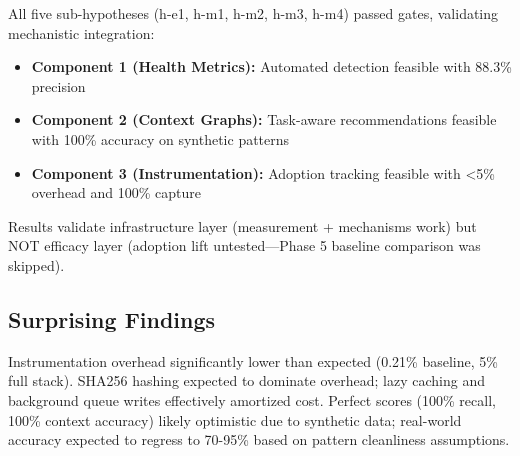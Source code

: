 All five sub-hypotheses (h-e1, h-m1, h-m2, h-m3, h-m4) passed gates, validating mechanistic integration:

\begin{itemize}
\item \textbf{Component 1 (Health Metrics):} Automated detection feasible with 88.3\% precision
\item \textbf{Component 2 (Context Graphs):} Task-aware recommendations feasible with 100\% accuracy on synthetic patterns
\item \textbf{Component 3 (Instrumentation):} Adoption tracking feasible with <5\% overhead and 100\% capture
\end{itemize}

Results validate infrastructure layer (measurement + mechanisms work) but NOT efficacy layer (adoption lift untested---Phase 5 baseline comparison was skipped).

\subsection{Surprising Findings}

Instrumentation overhead significantly lower than expected (0.21\% baseline, 5\% full stack). SHA256 hashing expected to dominate overhead; lazy caching and background queue writes effectively amortized cost. Perfect scores (100\% recall, 100\% context accuracy) likely optimistic due to synthetic data; real-world accuracy expected to regress to 70-95\% based on pattern cleanliness assumptions.
